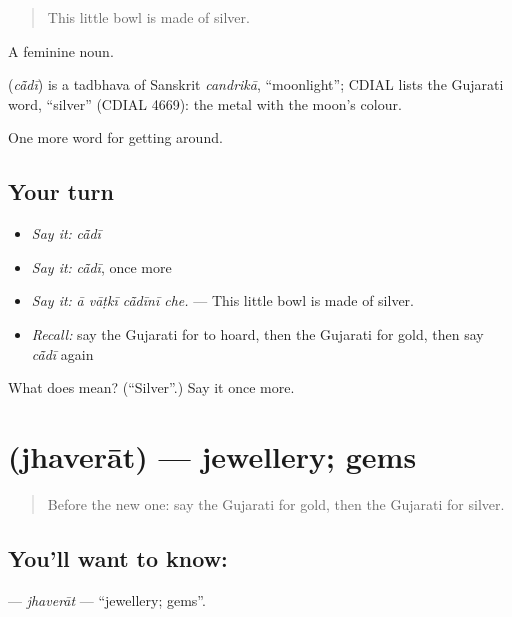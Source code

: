 \begin{quote}
This little bowl is made of silver.
\end{quote}

A feminine noun.

\begin{cousinweb}
\textbf{} (\emph{cā̃dī}) is a tadbhava of Sanskrit \emph{candrikā}, \textquotedblleft{}moonlight\textquotedblright{}; CDIAL lists the Gujarati word, \textquotedblleft{}silver\textquotedblright{} (CDIAL 4669): the metal with the moon's colour.
\end{cousinweb}

\begin{grammarlens}[title={What you've built}]
One more word for getting around.
\end{grammarlens}

\subsection*{Your turn}
\begin{itemize}
\raggedright
  \item \emph{Say it:} \emph{cā̃dī}
  \item \emph{Say it:} \emph{cā̃dī}, once more
  \item \emph{Say it:} \emph{ā vāṭkī cā̃dīnī che.} — This little bowl is made of silver.
  \item \emph{Recall:} say the Gujarati for to hoard, then the Gujarati for gold, then say \emph{cā̃dī} again
\end{itemize}

\begin{tcolorbox}[breakable,colback=teal!4,colframe=teal!35!black,title={Before you move on}]
What does  mean? (\textquotedblleft{}Silver\textquotedblright{}.) Say it once more.
\end{tcolorbox}
\section[\texorpdfstring{\gu{ઝવેરાત} (jhaverāt)}{ઝવેરાત (jhaverāt)}]{ (jhaverāt) — jewellery; gems}

\label{lesson:GU-C432-jhaverat}



\begin{quote}
Before the new one: say the Gujarati for gold, then the Gujarati for silver.
\end{quote}

\subsection*{You'll want to know: }
\textbf{} — \emph{jhaverāt} — \textquotedblleft{}jewellery; gems\textquotedblright{}.


